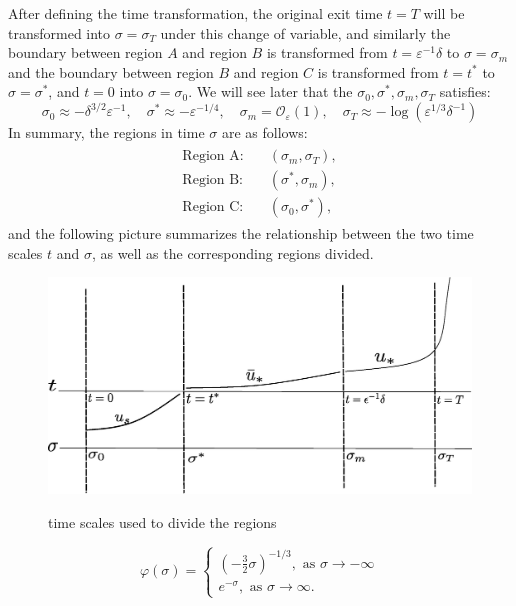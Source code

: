 \documentclass[letterpaper,11pt]{article}
\newcommand{\rmO}{\mathcal{O}}
\newcommand{\eps}{\varepsilon}
\numberwithin{equation}{section}
\theoremstyle{plain}
\begin{document}
After defining the time transformation, the original exit time $t=T$ will be transformed into $\sigma=\sigma_T$ under this change of variable, and similarly the boundary between region $A$ and region $B$ is  transformed from $t=\eps^{-1}\delta$ to $\sigma = \sigma_m$ and the boundary between region $B$ and region $C$ is  transformed from $t=t^*$ to $\sigma = \sigma^*$, and $t=0$ into $\sigma = \sigma_0$. We will see later that the $\sigma_0, \sigma^*, \sigma_m, \sigma_T$ satisfies:
\[
\sigma _0 \approx -\delta^{3/2}\eps^{-1}, \quad \sigma ^* \approx -\eps^{-1/4}, \quad \sigma_m = \rmO_\eps(1), \quad
\sigma_T \approx -\log(\eps^{1/3}\delta^{-1}) 
\]
In summary, the regions in time $\sigma$ are as follows:
\begin{align}\label{region_division_sig}
\begin{split}
\text{Region A:} & \quad (\sigma_m ,\sigma_T ),  \\
\text{Region B:} & \quad (\sigma^*, \sigma_m),  \\
\text{Region C:} & \quad (\sigma_0, \sigma^*),
\end{split}
\end{align}
and the following picture summarizes the relationship between the two time scales $t$ and $\sigma$, as well as the corresponding regions divided. 

\begin{figure}[ht]
 \centering %
 \scalebox{0.6} %
 {\includegraphics[angle = 0, origin = c]{pictures/time_scale.eps}} %
 \caption{time scales used to divide the regions}
\end{figure}\label{fig:time_scale} 

\iffalse
\begin{equation*}
\varphi(\sigma) =\begin{cases}
 (-\frac{3}{2}\sigma)^{-1/3}, \text{ as }\sigma \to -\infty\\
e^{-\sigma} , \text{ as }\sigma \to \infty.
\end{cases}
\end{equation*}
\end{document}
